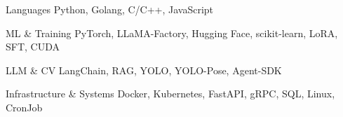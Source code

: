 

\begin{cvskills}


  \cvskill
    {Languages} %
    {Python, Golang, C/C++, JavaScript} %


  \cvskill
    {ML \& Training} %
    {PyTorch, LLaMA-Factory, Hugging Face, scikit-learn, LoRA, SFT, CUDA} %

  \cvskill
    {LLM \& CV} %
    {LangChain, RAG, YOLO, YOLO-Pose, Agent-SDK} %

  \cvskill
    {Infrastructure \& Systems} %
    {Docker, Kubernetes, FastAPI, gRPC, SQL, Linux, CronJob} %
    

\end{cvskills}
